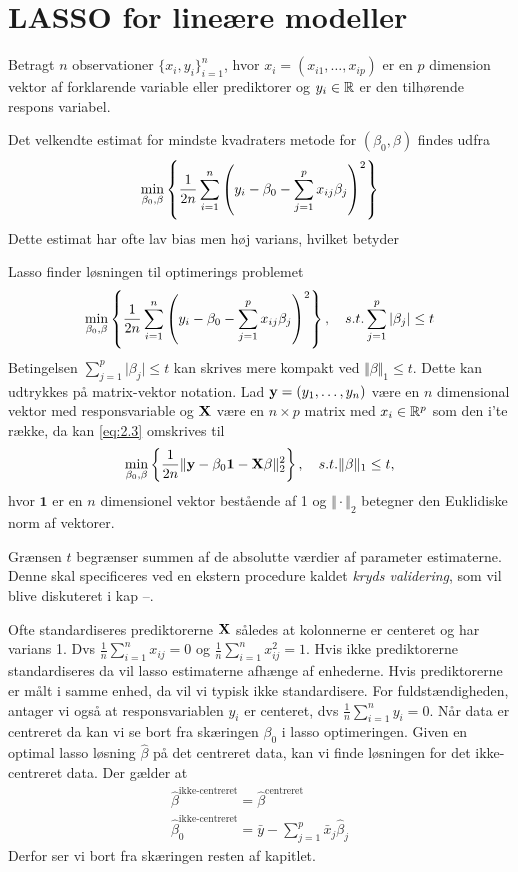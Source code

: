\section{LASSO for lineære modeller}

Betragt \(n\) observationer \(\{x_i, y_i\}_{i=1}^n \), hvor $x_i=(x_{i1}, \ldots, x_{ip})$ er en $p$ dimension vektor af forklarende variable eller prediktorer og $y_i \in \mathbb{R}$ er den tilhørende respons variabel.

Det velkendte estimat for mindste kvadraters metode for $(\beta_0, \beta)$ findes udfra
\begin{align*}
\min_{\beta_0, \beta} \cbr{\frac{1}{2n} \sum_{i=1}^n \del{y_i - \beta_0 - \sum_{j=1}^p x_{ij} \beta_j}^2}
\end{align*}
Dette estimat har ofte lav bias men høj varians, hvilket betyder



Lasso finder løsningen til optimerings problemet
\begin{align}
\min_{\beta_0, \beta} \cbr{\frac{1}{2n} \sum_{i=1}^n \del{y_i - \beta_0 - \sum_{j=1}^p x_{ij} \beta_j}^2}, \quad s.t. \sum_{j=1}^p \vert \beta_j \vert \leq t \label{eq:2.3}
\end{align}
Betingelsen $\sum_{j=1}^p \vert \beta_j \vert \leq t$ kan skrives mere kompakt ved $\Vert \beta \Vert_1 \leq t$.
Dette kan udtrykkes på matrix-vektor notation.
Lad \(\mathbf{y}=(y_1, \ldots, y_n)\) være en \(n\) dimensional vektor med responsvariable og \(\mathbf{X}\) være en $n \times p$ matrix med $x_i \in \mathbb{R}^p$ som den i'te række, da kan \eqref{eq:2.3} omskrives til
\begin{align*}
\min_{\beta_0, \beta} \cbr{\frac{1}{2n} \Vert \y - \beta_0 \mathbf{1} - \X \beta \Vert_2^2}, \quad s.t. \Vert \beta \Vert_1 \leq t,
\end{align*}
hvor \(\mathbf{1}\) er en \(n\) dimensionel vektor bestående af 1 og \(\Vert \cdot \Vert_2\) betegner den Euklidiske norm af vektorer.

Grænsen \(t\) begrænser summen af de absolutte værdier af parameter estimaterne.
Denne skal specificeres ved en ekstern procedure kaldet \textit{kryds validering}, som vil blive diskuteret i kap --.

Ofte standardiseres prediktorerne \(\mathbf{X}\) således at kolonnerne er centeret og har varians 1. Dvs \(\frac{1}{n} \sum_{i=1}^n x_{ij} = 0\) og \(\frac{1}{n} \sum_{i=1}^n x_{ij}^2=1\). Hvis ikke prediktorerne standardiseres da vil lasso estimaterne afhænge af enhederne.
Hvis prediktorerne er målt i samme enhed, da vil vi typisk ikke standardisere.
For fuldstændigheden, antager vi også at responsvariablen $y_i$ er centeret, dvs \(\frac{1}{n} \sum_{i=1}^n y_{i} = 0\).
Når data er centreret da kan vi se bort fra skæringen $\beta_0$ i lasso optimeringen.
Given en optimal lasso løsning \(\hat{\beta}\) på det centreret data, kan vi finde løsningen for det ikke-centreret data. Der gælder at
\begin{align*}
\hat{\beta}^{\text{ikke-centreret}} = \hat{\beta}^{\text{centreret}} \\
\hat{\beta}_0^{\text{ikke-centreret}} = \bar{y} - \sum_{j=1}^p \bar{x}_j \hat{\beta}_j
\end{align*}
Derfor ser vi bort fra skæringen resten af kapitlet.

